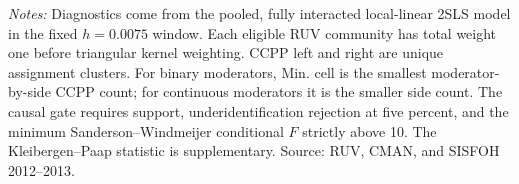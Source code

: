 \begin{table}[!htbp]
\centering
\caption{Local support and fuzzy-heterogeneity identification diagnostics}
\label{tab:hte-2013_household-diagnostics}
\small
{}
\parbox{0.97\linewidth}{\footnotesize \textit{Notes:} Diagnostics come from the pooled, fully interacted local-linear 2SLS model in the fixed \(h=0.0075\) window. Each eligible RUV community has total weight one before triangular kernel weighting. CCPP left and right are unique assignment clusters. For binary moderators, Min. cell is the smallest moderator-by-side CCPP count; for continuous moderators it is the smaller side count. The causal gate requires support, underidentification rejection at five percent, and the minimum Sanderson--Windmeijer conditional \(F\) strictly above 10. The Kleibergen--Paap statistic is supplementary. Source: RUV, CMAN, and SISFOH 2012--2013.}
\end{table}
